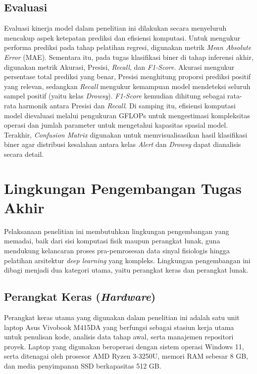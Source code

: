 \subsection{Evaluasi} \label{III.Langkah8}
Evaluasi kinerja model dalam penelitian ini dilakukan secara menyeluruh mencakup aspek ketepatan prediksi dan efisiensi komputasi. Untuk mengukur performa prediksi pada tahap pelatihan regresi, digunakan metrik \textit{Mean Absolute Error} (MAE). Sementara itu, pada tugas klasifikasi biner di tahap inferensi akhir, digunakan metrik Akurasi, Presisi, \textit{Recall}, dan \textit{F1-Score}. Akurasi mengukur persentase total prediksi yang benar, Presisi menghitung proporsi prediksi positif yang relevan, sedangkan \textit{Recall} mengukur kemampuan model mendeteksi seluruh sampel positif (yaitu kelas \textit{Drowsy}). \textit{F1-Score} kemudian dihitung sebagai rata-rata harmonik antara Presisi dan \textit{Recall}. Di samping itu, efisiensi komputasi model dievaluasi melalui pengukuran GFLOPs untuk mengestimasi kompleksitas operasi dan jumlah parameter untuk mengetahui kapasitas spasial model. Terakhir, \textit{Confusion Matrix} digunakan untuk memvisualisasikan hasil klasifikasi biner agar distribusi kesalahan antara kelas \textit{Alert} dan \textit{Drowsy} dapat dianalisis secara detail.

\section{Lingkungan Pengembangan Tugas Akhir} \label{III.Lingkungan Pengembangan}
Pelaksanaan penelitian ini membutuhkan lingkungan pengembangan yang memadai, baik dari sisi komputasi fisik maupun perangkat lunak, guna mendukung kelancaran proses pra-pemrosesan data sinyal fisiologis hingga pelatihan arsitektur \textit{deep learning} yang kompleks. Lingkungan pengembangan ini dibagi menjadi dua kategori utama, yaitu perangkat keras dan perangkat lunak.

\subsection{Perangkat Keras (\textit{Hardware})}
Perangkat keras utama yang digunakan dalam penelitian ini adalah satu unit laptop Asus Vivobook M415DA yang berfungsi sebagai stasiun kerja utama untuk penulisan kode, analisis data tahap awal, serta manajemen repositori proyek. Laptop yang digunakan beroperasi dengan sistem operasi Windows 11, serta ditenagai oleh prosesor AMD Ryzen 3-3250U, memori RAM sebesar 8 GB, dan media penyimpanan SSD berkapasitas 512 GB. 

